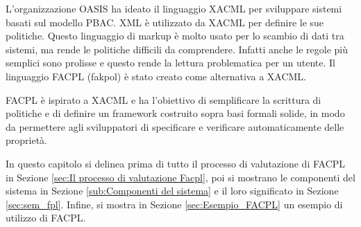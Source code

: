 \label{chap:Formal Access Control Policy Language}
L'organizzazione \ac{OASIS} ha ideato il linguaggio \ac{XACML} per sviluppare sistemi basati sul modello \ac{PBAC}.
\ac{XML} è utilizzato da \ac{XACML} per definire le sue politiche. Questo linguaggio di markup è molto usato per lo scambio
di dati tra sistemi, ma rende le politiche difficili da comprendere. Infatti anche le regole più semplici sono prolisse
e questo rende la lettura problematica per un utente.
Il linguaggio \ac{FACPL} (fakpol) è stato creato come alternativa a \ac{XACML}.\par
\ac{FACPL} è ispirato a \ac{XACML} e ha l'obiettivo di semplificare la scrittura di politiche e di definire un framework
costruito sopra basi formali solide, in modo da permettere agli sviluppatori di specificare e verificare automaticamente
delle proprietà.

In questo capitolo si delinea prima di tutto il processo di valutazione di \ac{FACPL}
in Sezione \ref{sec:Il processo di valutazione Facpl},
poi si mostrano le componenti del sistema in Sezione \ref{sub:Componenti del sistema} e il loro significato in Sezione \ref{sec:sem_fpl}. Infine, si
mostra in Sezione \ref{sec:Esempio_FACPL} un esempio di utilizzo di \ac{FACPL}.
